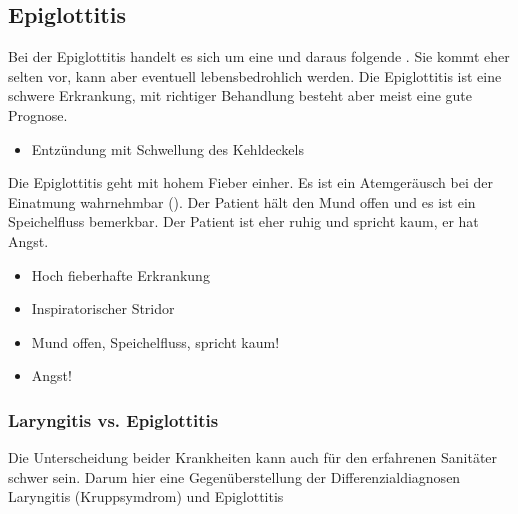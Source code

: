 \subsection{Epiglottitis}
\label{topic:epiglottitis}

{%
Bei der Epiglottitis handelt es sich um eine  und daraus folgende . Sie kommt eher selten vor, kann aber eventuell
lebensbedrohlich werden. Die Epiglottitis ist eine schwere
Erkrankung, mit richtiger  Behandlung besteht aber meist
eine gute Prognose.
}{%
\begin{itemize}
  \item Entzündung mit Schwellung des Kehldeckels
\end{itemize}
}{}{}{}



{%
Die Epiglottitis geht mit hohem Fieber einher. Es ist ein
Atemgeräusch bei der Einatmung wahrnehmbar
(). Der Patient hält den Mund
offen und es ist ein Speichelfluss bemerkbar. Der Patient
ist eher ruhig und spricht kaum, er hat Angst.

\bigskip

\bigskip
}{%
\begin{itemize}
    \item Hoch fieberhafte Erkrankung
    \item Inspiratorischer Stridor
    \item Mund offen, Speichelfluss, spricht kaum!
    \item Angst!
\end{itemize}
}{}{}{}

% 

\subsubsection{Laryngitis vs. Epiglottitis}
 
Die Unterscheidung beider Krankheiten kann auch für den
erfahrenen Sanitäter schwer sein. Darum hier eine
Gegenüberstellung der Differenzialdiagnosen Laryngitis
(Kruppsymdrom) und Epiglottitis


